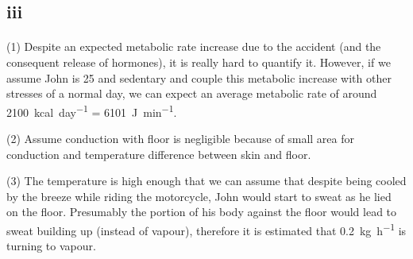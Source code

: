 \subsection*{iii}

\paragraph{}

    (1) Despite an expected metabolic rate increase due to the accident (and the consequent release of hormones), it is really hard to quantify it. However, if we assume John is 25 and sedentary and couple this metabolic increase with other stresses of a normal day, we can expect an average metabolic rate of around \SI{2100}{kcal\per day} = \SI{6101}{J\per min}. 

    (2) Assume conduction with floor is negligible because of small area for conduction and temperature difference between skin and floor.

    (3) The temperature is high enough that we can assume that despite being cooled by the breeze while riding the motorcycle, John would start to sweat as he lied on the floor. Presumably the portion of his body against the floor would lead to sweat building up (instead of vapour), therefore it is estimated that \SI{0.2}{kg.h^{-1}} is turning to vapour.